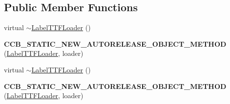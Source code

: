 \subsection*{Public Member Functions}
\begin{DoxyCompactItemize}
\item 
virtual \hyperlink{classcocosbuilder_1_1LabelTTFLoader_ac53c82a480c93a10a7279d26df79a343}{$\sim$\+Label\+T\+T\+F\+Loader} ()
\item 
\mbox{\label{classcocosbuilder_1_1LabelTTFLoader_a29f41df90896c3a7cdd97bcc235ffa15}} 
{\bfseries C\+C\+B\+\_\+\+S\+T\+A\+T\+I\+C\+\_\+\+N\+E\+W\+\_\+\+A\+U\+T\+O\+R\+E\+L\+E\+A\+S\+E\+\_\+\+O\+B\+J\+E\+C\+T\+\_\+\+M\+E\+T\+H\+OD} (\hyperlink{classcocosbuilder_1_1LabelTTFLoader}{Label\+T\+T\+F\+Loader}, loader)
\item 
virtual \hyperlink{classcocosbuilder_1_1LabelTTFLoader_ac53c82a480c93a10a7279d26df79a343}{$\sim$\+Label\+T\+T\+F\+Loader} ()
\item 
\mbox{\label{classcocosbuilder_1_1LabelTTFLoader_a29f41df90896c3a7cdd97bcc235ffa15}} 
{\bfseries C\+C\+B\+\_\+\+S\+T\+A\+T\+I\+C\+\_\+\+N\+E\+W\+\_\+\+A\+U\+T\+O\+R\+E\+L\+E\+A\+S\+E\+\_\+\+O\+B\+J\+E\+C\+T\+\_\+\+M\+E\+T\+H\+OD} (\hyperlink{classcocosbuilder_1_1LabelTTFLoader}{Label\+T\+T\+F\+Loader}, loader)
\end{DoxyCompactItemize}
